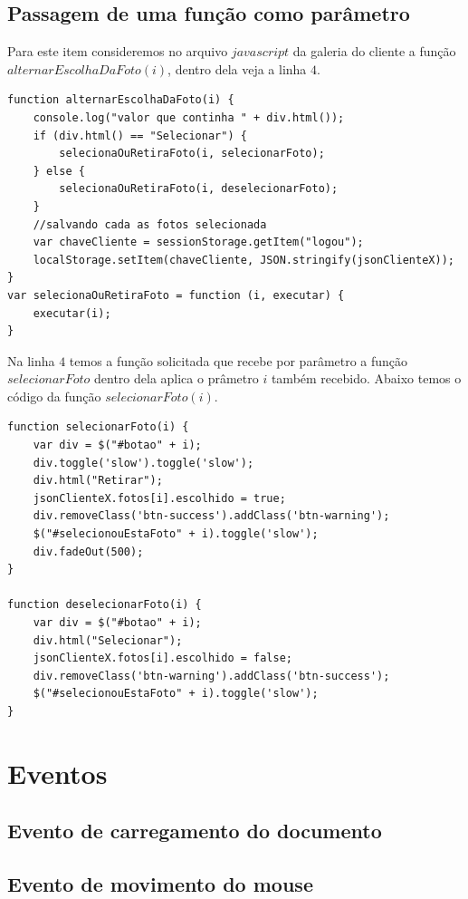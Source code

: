\subsection{Passagem de uma função como parâmetro}
	Para este item consideremos no arquivo $javascript$ da galeria do cliente a função $alternarEscolhaDaFoto(i)$, dentro dela veja a linha $4$.	
	
\begin{lstlisting}	
function alternarEscolhaDaFoto(i) {
    console.log("valor que continha " + div.html());
    if (div.html() == "Selecionar") {
        selecionaOuRetiraFoto(i, selecionarFoto);
    } else {
        selecionaOuRetiraFoto(i, deselecionarFoto);
    }
    //salvando cada as fotos selecionada
    var chaveCliente = sessionStorage.getItem("logou");
    localStorage.setItem(chaveCliente, JSON.stringify(jsonClienteX));
}
var selecionaOuRetiraFoto = function (i, executar) {
    executar(i);
}

\end{lstlisting}
	Na linha $4$ temos a função solicitada que recebe por parâmetro a função $selecionarFoto$ dentro dela aplica o prâmetro $i$ também recebido. Abaixo temos o código da função $selecionarFoto(i)$.
	
\begin{lstlisting}
function selecionarFoto(i) {
    var div = $("#botao" + i);
    div.toggle('slow').toggle('slow');
    div.html("Retirar");
    jsonClienteX.fotos[i].escolhido = true;
    div.removeClass('btn-success').addClass('btn-warning');
    $("#selecionouEstaFoto" + i).toggle('slow');
    div.fadeOut(500);
}

function deselecionarFoto(i) {
    var div = $("#botao" + i);
    div.html("Selecionar");
    jsonClienteX.fotos[i].escolhido = false;
    div.removeClass('btn-warning').addClass('btn-success');
    $("#selecionouEstaFoto" + i).toggle('slow');
}	
	\end{lstlisting}

\section{Eventos}

\subsection{Evento de carregamento do documento}


\subsection{Evento de movimento do mouse}


